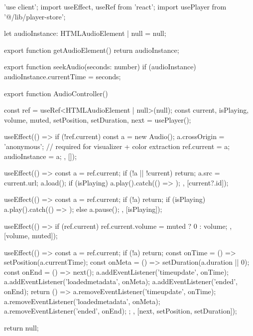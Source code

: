 'use client';
import { useEffect, useRef } from 'react';
import { usePlayer } from '@/lib/player-store';

let audioInstance: HTMLAudioElement | null = null;

export function getAudioElement() {
  return audioInstance;
}

export function seekAudio(seconds: number) {
  if (audioInstance) audioInstance.currentTime = seconds;
}

export function AudioController() {
  const ref = useRef<HTMLAudioElement | null>(null);
  const { current, isPlaying, volume, muted, setPosition, setDuration, next } =
    usePlayer();

  useEffect(() => {
    if (!ref.current) {
      const a = new Audio();
      a.crossOrigin = 'anonymous'; // required for visualizer + color extraction
      ref.current = a;
      audioInstance = a;
    }
  }, []);

  useEffect(() => {
    const a = ref.current;
    if (!a || !current) return;
    a.src = current.url;
    a.load();
    if (isPlaying) a.play().catch(() => {});
  }, [current?.id]);

  useEffect(() => {
    const a = ref.current;
    if (!a) return;
    if (isPlaying) a.play().catch(() => {});
    else a.pause();
  }, [isPlaying]);

  useEffect(() => {
    if (ref.current) ref.current.volume = muted ? 0 : volume;
  }, [volume, muted]);

  useEffect(() => {
    const a = ref.current;
    if (!a) return;
    const onTime = () => setPosition(a.currentTime);
    const onMeta = () => setDuration(a.duration || 0);
    const onEnd = () => next();
    a.addEventListener('timeupdate', onTime);
    a.addEventListener('loadedmetadata', onMeta);
    a.addEventListener('ended', onEnd);
    return () => {
      a.removeEventListener('timeupdate', onTime);
      a.removeEventListener('loadedmetadata', onMeta);
      a.removeEventListener('ended', onEnd);
    };
  }, [next, setPosition, setDuration]);

  return null;
}
